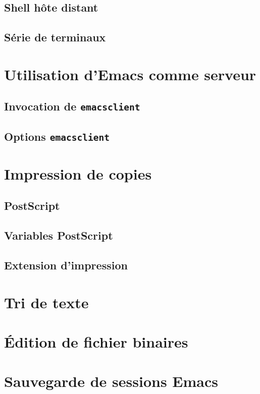 \subsection{Shell hôte distant}
\subsection{Série de terminaux}

\section{Utilisation d'Emacs comme serveur}
\subsection{Invocation de \texttt{emacsclient}}
\subsection{Options \texttt{emacsclient}}

\section{Impression de copies}
\subsection{PostScript}
\subsection{Variables PostScript}
\subsection{Extension d'impression}

\section{Tri de texte}

\section{\'Edition de fichier binaires}

\section{Sauvegarde de sessions Emacs}

